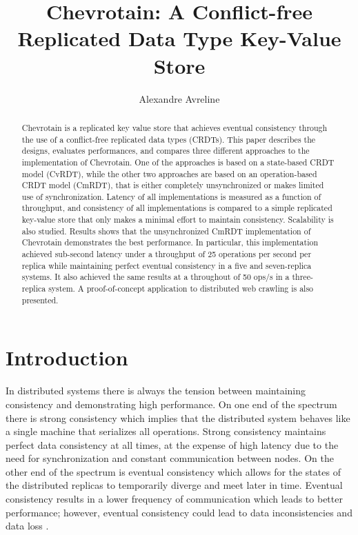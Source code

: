 \documentclass[sigconf,nonacm,10pt]{acmart}
\begin{document}
\title{Chevrotain: A Conflict-free Replicated Data Type Key-Value Store}

\author{Alexandre Avreline}

\begin{abstract}
Chevrotain is a replicated key value store that achieves eventual consistency through the use of a conflict-free replicated data types (CRDTs). This paper describes the designs, evaluates performances, and compares three different approaches to the implementation of Chevrotain. One of the approaches is based on a state-based CRDT model (CvRDT), while the other two approaches are based on an operation-based CRDT model (CmRDT), that is either completely unsynchronized or makes limited use of synchronization. Latency of all implementations is measured as a function of throughput, and consistency of all implementations is compared to a simple replicated key-value store that only makes a minimal effort to maintain consistency. Scalability is also studied. Results shows that the unsynchronized CmRDT implementation of Chevrotain demonstrates the best performance. In particular, this implementation achieved sub-second latency under a throughput of 25 operations per second per replica while maintaining perfect eventual consistency in a five and seven-replica systems. It also achieved the same results at a throughout of 50 ops/s in a three-replica system. A proof-of-concept application to distributed web crawling is also presented.\end{abstract}


\maketitle

\section{Introduction} 

In distributed systems there is always the tension between maintaining consistency and demonstrating high performance. On one end of the spectrum there is strong consistency which implies that the distributed system behaves like a single machine that serializes all operations. Strong consistency maintains perfect data consistency at all times, at the expense of high latency due to the need for synchronization and constant communication between nodes. On the other end of the spectrum is eventual consistency which allows for the states of the distributed replicas to temporarily diverge and meet later in time. Eventual consistency results in a lower frequency of communication which leads to better performance; however, eventual consistency could lead to data inconsistencies and data loss \cite{li2012making}. 
\end{document}
